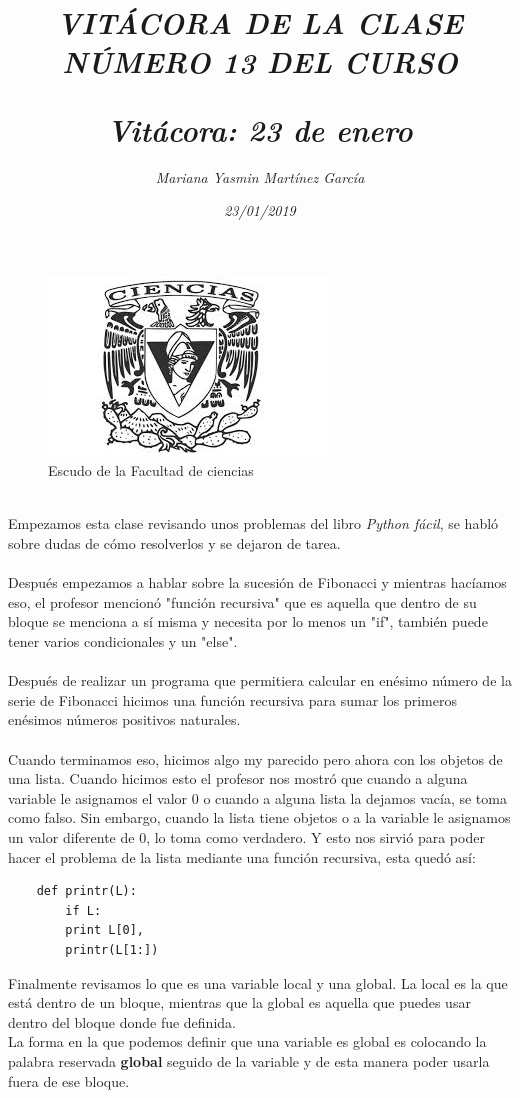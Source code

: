 \documentclass{article}
\title{\Huge\item\color{purple}\textit{VITÁCORA DE LA CLASE NÚMERO 13 DEL CURSO}}
\author{\Large\textit{ Mariana Yasmin Martínez García}}
\date{\Large\textit{ 23/01/2019}}
\begin{document}
\begin{figure}[t]
	\centering
	\includegraphics[width=0.8\linewidth]{Imagenes/1}
	\caption{Escudo de la Facultad de ciencias}
	\label{fig:1}
\end{figure}
	\maketitle
		
	\newpage
	
	\title{\Huge\textbf{\color{purple}\textit{Vitácora: 23 de enero\\}}} \\
	Empezamos esta clase revisando unos problemas del libro \textit{Python fácil}, se habló sobre  dudas de cómo resolverlos y se dejaron de tarea. \\ \\
	Después empezamos a hablar sobre la sucesión de Fibonacci y mientras hacíamos eso, el profesor mencionó "función recursiva" que es aquella que dentro de su bloque se menciona a sí misma y necesita por lo menos un "if", también puede tener varios condicionales y un "else". \\ \\
	Después de realizar un programa que permitiera calcular en enésimo número de la serie de Fibonacci hicimos una función recursiva para sumar los primeros enésimos números positivos naturales. \\ \\
	Cuando terminamos eso, hicimos algo my parecido pero ahora con los objetos de una lista. Cuando hicimos esto el profesor nos mostró que cuando a alguna variable le asignamos el valor 0 o cuando a alguna lista la dejamos vacía, se toma como falso. Sin embargo, cuando la lista tiene objetos o a la variable le asignamos un valor diferente de 0, lo toma como verdadero. Y esto nos sirvió para poder hacer el problema de la lista mediante una función recursiva, esta quedó así:  \\
	\begin{verbatim}
	def printr(L):
		if L: 
		print L[0],
		printr(L[1:])
	\end{verbatim}
	Finalmente revisamos lo que es una variable local y una global. La local es la que está dentro de un bloque, mientras que la global es aquella que puedes usar dentro del bloque donde fue definida. \\
	La forma en la que podemos definir que una variable es global es colocando la palabra reservada \textbf{global} seguido de la variable y de esta manera poder usarla fuera de ese bloque.
\end{document}
